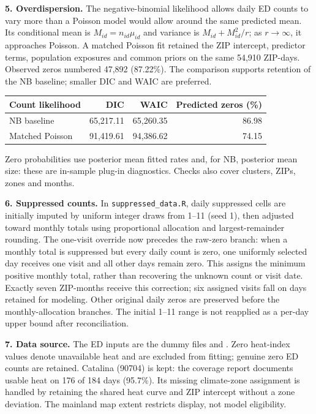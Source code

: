 \documentclass[10pt]{article}
\begin{document}
\textbf{5. Overdispersion.}
The negative-binomial likelihood allows daily ED counts to vary more than
a Poisson model would allow around the same predicted mean.
Its conditional mean is $M_{id}=n_{id}\mu_{id}$ and variance is
$M_{id}+M_{id}^2/r$; as $r\to\infty$, it approaches Poisson.
A matched Poisson fit retained the ZIP intercept, predictor terms,
population exposures and common priors on the same 54,910 ZIP-days.
Observed zeros numbered 47,892 (87.22\%). The comparison supports retention
of the NB baseline; smaller DIC and WAIC are preferred.
\begin{center}
\small
\renewcommand{\arraystretch}{1.15}
\begin{tabular}{lrrr}
\hline
Count likelihood & DIC & WAIC & Predicted zeros (\%)\\
\hline
NB baseline & 65,217.11 & 65,260.35 & 86.98\\
Matched Poisson & 91,419.61 & 94,386.62 & 74.15\\
\hline
\end{tabular}
\end{center}
Zero probabilities use posterior mean
fitted rates and, for NB, posterior mean size: these are in-sample
plug-in diagnostics. Checks also cover clusters, ZIPs, zones and months.

\textbf{6. Suppressed counts.}
In \texttt{suppressed\_data.R}, daily suppressed cells are initially
imputed by uniform integer draws from 1--11 (seed 1), then adjusted
toward monthly totals using proportional allocation and largest-remainder
rounding. The one-visit override now precedes the raw-zero branch:
when a monthly total is suppressed but every daily count is zero, one
uniformly selected day receives one visit and all other days remain zero.
This assigns the minimum positive monthly total, rather than recovering the
unknown count or visit date. Exactly seven ZIP-months receive this correction;
six assigned visits fall on days retained for modeling. Other original daily
zeros are preserved before the monthly-allocation branches. The
initial 1--11 range is not reapplied as a per-day upper bound after
reconciliation.

\textbf{7. Data source.}
The ED inputs are the dummy files
 and
.
Zero heat-index values denote unavailable heat and are excluded from
fitting; genuine zero ED counts are retained. Catalina (90704) is kept:
the coverage report documents usable heat on 176 of 184 days (95.7\%).
Its missing climate-zone assignment is handled by retaining the shared
heat curve and ZIP intercept without a zone deviation.
The mainland map extent restricts display, not model eligibility.
\end{document}
